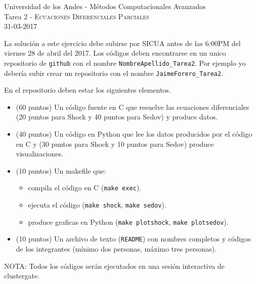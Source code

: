 \documentclass[11pt,letterpaper]{exam}
\begin{document}
\begin{center}
{\Large Universidad de los Andes - M\'etodos Computacionales Avanzados} \\
Tarea 2 - \textsc{Ecuaciones Diferenciales Parciales}\\
31-03-2017\\
\end{center}

\vspace{0.3cm}


\noindent
La soluci\'on a este ejercicio debe subirse por SICUA antes de las 6:00PM
del viernes 28 de abril del 2017. 
Los c\'odigos deben encontrarse en un unico repositorio de \verb'github'
con el nombre \verb"NombreApellido_Tarea2". Por ejemplo yo deber\'ia
subir crear un repositorio con el nombre \verb"JaimeForero_Tarea2". 

\noindent
En el repositorio deben estar los siguientes elementos.
\begin{itemize}
\item (60 puntos) Un c\'odigo fuente en C que resuelve
  las ecuaciones diferenciales (20 puntos para Shock y 40 puntos para
  Sedov) y produce datos.  
\item (40 puntos) Un c\'odigo en Python que lee los datos producidos por el
  c\'odigo en C y (30 puntos para Shock y 10 puntos para Sedov)
  produce visualizaciones. 
\item (10 puntos) Un makefile que:
\begin{itemize}
\item compila el c\'odigo en C (\verb"make exec").
\item ejecuta el c\'odigo (\verb"make shock", \verb"make sedov").
\item produce graficas en Python (\verb"make plotshock", \verb"make plotsedov").
\end{itemize}
\item (10 puntos) Un archivo de texto (\verb"README") con nombres completos y c\'odigos de los integrantes (m\'inimo dos personas, m\'aximo tres personas).
\end{itemize}
NOTA: Todos los c\'odigos ser\'an ejecutados en una sesi\'on
interactiva de clustergate.

\vspace{0.3cm}
\end{document}
